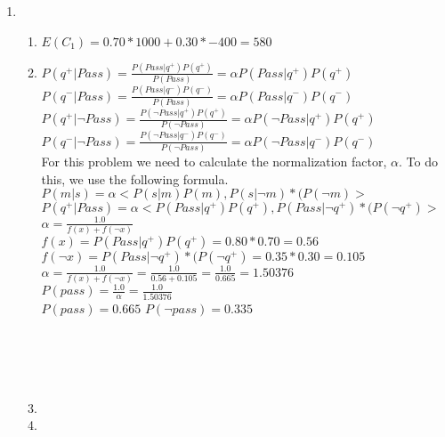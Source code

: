 \documentclass[12pt,a4paper]{report}
\begin{document}
\begin{enumerate}
\pagebreak
\item
\begin{enumerate}
	\item
	$E(C_{1}) = 0.70*1000 + 0.30*-400 = 580$
	
	\item
	$P(q^{+}|Pass) = \frac{P(Pass|q^{+})P(q^{+})}{P(Pass)} = \alpha P(Pass|q^{+})P(q^{+})$\\
	$P(q^{-}|Pass) = \frac{P(Pass|q^{-})P(q^{-})}{P(Pass)} = \alpha P(Pass|q^{-})P(q^{-})$\\
	$P(q^{+}|\neg Pass) = \frac{P(\neg Pass|q^{+})P(q^{+})}{P(\neg Pass)} = \alpha P(\neg Pass|q^{+})P(q^{+})$\\
	$P(q^{-}|\neg Pass) = \frac{P(\neg Pass|q^{-})P(q^{-})}{P(\neg Pass)} = \alpha P(\neg Pass|q^{-})P(q^{-})$\\
	For this problem we need to calculate the normalization factor, $\alpha$. To do this, we use the following formula.\\
	$P(m|s)=\alpha <P(s|m)P(m),P(s|\neg m)*(P(\neg m)>$\\
	$P(q^{+}|Pass)=\alpha <P(Pass|q^{+})P(q^{+}),P(Pass|\neg q^{+})*(P(\neg q^{+})>$\\
	$\alpha = \frac{1.0}{f(x)+f(\neg x)}$\\
	$f(x) = P(Pass|q^{+})P(q^{+}) = 0.80*0.70 = 0.56$\\
	$f(\neg x) = P(Pass|\neg q^{+})*(P(\neg q^{+}) = 0.35 * 0.30 = 0.105$\\
	$\alpha = \frac{1.0}{f(x)+f(\neg x)} = \frac{1.0}{0.56+0.105} = \frac{1.0}{0.665} = 1.50376$\\
	$P(pass) = \frac{1.0}{\alpha} = \frac{1.0}{1.50376}$\\
	$P(pass) = 0.665$ $P(\neg pass) = 0.335$\\
	\\
	\\
	\\
	\\
	
	\item
	
	\item
	
\end{enumerate}

\end{enumerate}
\end{document}
